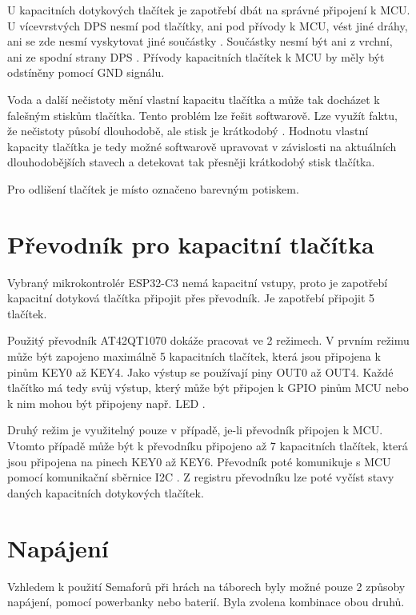 U kapacitních dotykových tlačítek je zapotřebí dbát na správné připojení k MCU. U vícevrstvých DPS nesmí pod tlačítky, ani pod přívody
k MCU, vést jiné dráhy, ani se zde nesmí vyskytovat jiné součástky \cite{PrincipKapTl}. Součástky nesmí být ani z vrchní, ani ze spodní 
strany DPS \cite{PrincipKapTl}. Přívody kapacitních tlačítek k MCU by měly být odstíněny pomocí GND signálu.

Voda a další nečistoty mění vlastní kapacitu tlačítka a může tak docházet k falešným stiskům tlačítka. Tento problém lze řešit softwarově. 
Lze využít faktu, že nečistoty působí dlouhodobě, ale stisk je krátkodobý \cite{PrincipKapTl}. Hodnotu vlastní kapacity tlačítka je tedy
možné softwarově upravovat v závislosti na aktuálních dlouhodobějších stavech a detekovat tak přesněji krátkodobý stisk tlačítka.

Pro odlišení tlačítek je místo označeno barevným potiskem. 

\section{Převodník pro kapacitní tlačítka}
Vybraný mikrokontrolér ESP32-C3 nemá kapacitní vstupy, proto je zapotřebí kapacitní dotyková tlačítka připojit přes převodník. Je zapotřebí připojit 
5 tlačítek. 

Použitý převodník AT42QT1070 dokáže pracovat ve 2 režimech. V prvním režimu může být zapojeno maximálně 5 kapacitních tlačítek, která jsou připojena
k pinům KEY0 až KEY4. Jako výstup se používají piny OUT0 až OUT4. Každé tlačítko má tedy svůj výstup, který může být připojen k GPIO pinům MCU 
nebo k nim mohou být připojeny např. LED \cite{conv_cap_but_AT42QT1070_dtsh}. 

Druhý režim je využitelný pouze v případě, je-li převodník připojen k MCU. Vtomto případě může být k převodníku připojeno až 7 kapacitních tlačítek, 
která jsou připojena na pinech KEY0 až KEY6. Převodník poté komunikuje s MCU pomocí komunikační sběrnice I2C \cite{conv_cap_but_AT42QT1070_dtsh}. 
Z registru převodníku lze poté vyčíst stavy daných kapacitních dotykových tlačítek. 

\section{Napájení}
Vzhledem k použití Semaforů při hrách na táborech byly možné pouze 2 způsoby napájení, pomocí powerbanky nebo baterií. Byla zvolena kombinace obou druhů.


